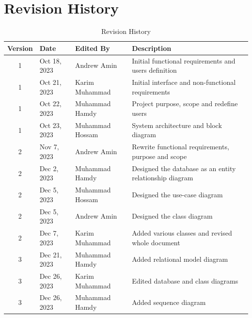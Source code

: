 \documentclass{BusMateSRS}
\def\nameAndrew{Andrew Amin}
\def\nameKarim{Karim Muhammad}
\def\nameHamdy{Muhammad Hamdy}
\def\nameHossam{Muhammad Hossam}
\begin{document}
\maketitle
\tableofcontents
\listoffigures
\listoftables

\chapter*{Revision History}
\begin{table}[ht!]
	\centering
	\begin{tabularx}{\textwidth}{|c|l|l|X|}
		\hline
		\textbf{Version} & \textbf{Date} & \textbf{Edited By} & \textbf{Description} \\
		\hline
		1                & Oct 18, 2023  & \nameAndrew        &
		Initial functional requirements and users definition                         \\
		\hline
		1                & Oct 21, 2023  & \nameKarim         &
		Initial interface and non-functional requirements                            \\
		\hline
		1                & Oct 22, 2023  & \nameHamdy         &
		Project purpose, scope and redefine users                                    \\
		\hline
		1                & Oct 23, 2023  & \nameHossam        &
		System architecture and block diagram                                        \\
		\hline
		2                & Nov 7, 2023   & \nameAndrew        &
		Rewrite functional requirements, purpose and scope                           \\
		\hline
		2                & Dec 2, 2023   & \nameHamdy         &
		Designed the database as an entity relationship diagram                      \\
		\hline
		2                & Dec 5, 2023   & \nameHossam        &
		Designed the use-case diagram                                                \\
		\hline
		2                & Dec 5, 2023   & \nameAndrew        &
		Designed the class diagram                                                   \\
		\hline
		2                & Dec 7, 2023   & \nameKarim         &
		Added various classes and revised whole document                             \\
		\hline
		3                & Dec 21, 2023   & \nameHamdy        &
		Added relational model diagram                                               \\
		\hline
		3                & Dec 26, 2023   & \nameKarim &
		Edited database and class diagrams \\
		\hline
		3                & Dec 26, 2023   & \nameHamdy        &
		Added sequence diagram \\
		\hline
	\end{tabularx}
	\caption{Revision History}
	\label{tab:revision-history}
\end{table}
\end{document}
